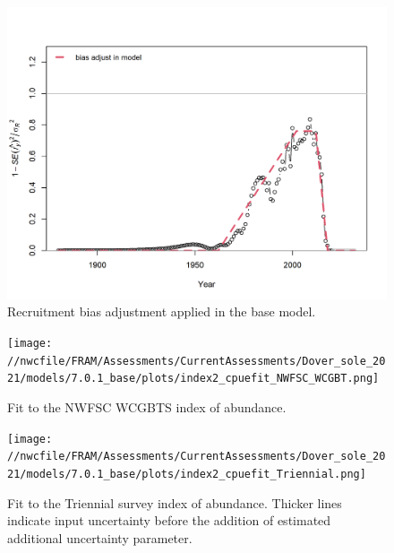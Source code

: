 \documentclass[11pt,
  english,
  a4paper,
]{article}
\begin{document}
\begin{figure}
\centering
\includegraphics[width=1\textwidth,height=1\textheight]{figs/recruit_fit_bias_adjust.png}
\caption{Recruitment bias adjustment applied in the base model.\label{fig:bias-adj}}
\end{figure}

\tagmcend\tagstructend


\begin{figure}
\centering
\texttt{[image: //nwcfile/FRAM/Assessments/CurrentAssessments/Dover\_sole\_2021/models/7.0.1\_base/plots/index2\_cpuefit\_NWFSC\_WCGBT.png]}
\caption{Fit to the NWFSC WCGBTS index of abundance.\label{fig:wcgbt-index-fit}}
\end{figure}

\tagmcend\tagstructend


\begin{figure}
\centering
\texttt{[image: //nwcfile/FRAM/Assessments/CurrentAssessments/Dover\_sole\_2021/models/7.0.1\_base/plots/index2\_cpuefit\_Triennial.png]}
\caption{Fit to the Triennial survey index of abundance. Thicker lines indicate input uncertainty before the addition of estimated additional uncertainty parameter.\label{fig:tri-index-fit}}
\end{figure}
\end{document}
